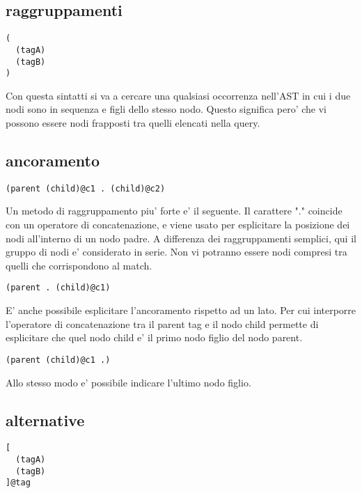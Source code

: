 \subsection{raggruppamenti}

\begin{lstlisting}
(
  (tagA)
  (tagB)
)
\end{lstlisting}

Con questa sintatti si va a cercare una qualsiasi occorrenza nell'AST in cui i due nodi sono in sequenza e figli dello stesso nodo.
Questo significa pero' che vi possono essere nodi frapposti tra quelli elencati nella query.

\subsection{ancoramento}

\begin{lstlisting}
(parent (child)@c1 . (child)@c2)
\end{lstlisting}

Un metodo di raggruppamento piu' forte e' il seguente.
Il carattere "." coincide con un operatore di concatenazione, e viene usato per esplicitare la posizione dei nodi all'interno di un nodo padre.
A differenza dei raggruppamenti semplici, qui il gruppo di nodi e' considerato in serie.
Non vi potranno essere nodi compresi tra quelli che corrispondono al match.

\begin{lstlisting}
(parent . (child)@c1)
\end{lstlisting}

E' anche possibile esplicitare l'ancoramento rispetto ad un lato.
Per cui interporre l'operatore di concatenazione tra il parent tag e il nodo child permette di esplicitare che quel nodo child e' il primo nodo figlio del nodo parent.

\begin{lstlisting}
(parent (child)@c1 .)
\end{lstlisting}

Allo stesso modo e' possibile indicare l'ultimo nodo figlio.

\subsection{alternative}

\begin{lstlisting}
[
  (tagA)
  (tagB)
]@tag
\end{lstlisting}

